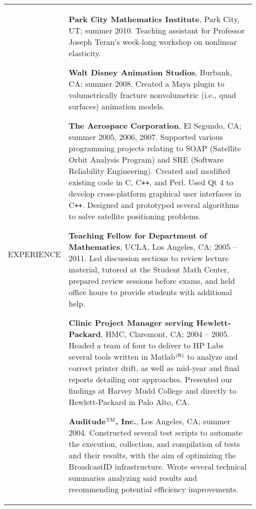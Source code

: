 \documentclass{article}
\begin{document}
\begin{center}
\vspace{\VS}

\begin{tabular}{@{}p{\CWa\columnwidth}@{}p{\CWb\columnwidth}@{}}
{\small EXPERIENCE} &
\begin{minipage}[t]{\CWb\columnwidth}
\par \textbf{Park City Mathematics Institute}, Park City, UT; summer 2010.  Teaching assistant for Professor Joseph Teran's week-long workshop on nonlinear elasticity.
\par \textbf{Walt Disney Animation Studios}, Burbank, CA; summer 2008.  Created a Maya plugin to volumetrically fracture nonvolumetric (i.e., quad surfaces) animation models.
\vspace{\VSEX}
\par \textbf{The Aerospace Corporation}, El Segundo, CA; summer 2005, 2006, 2007.  Supported various programming projects relating to SOAP (Satellite Orbit Analysis Program) and SRE (Software Reliability Engineering).  Created and modified existing code in C, C{\tt ++}, and Perl.  Used Qt 4 to develop cross-platform graphical user interfaces in C{\tt ++}.  Designed and prototyped several algorithms to solve satellite positioning problems.
\vspace{\VSEX}
\par \textbf{Teaching Fellow for Department of Mathematics}, UCLA, Los Angeles, CA; 2005 -- 2011.  Led discussion sections to review lecture material, tutored at the Student Math Center, prepared review sessions before exams, and held office hours to provide students with additional help.  %
\vspace{\VSEX}
\par \textbf{Clinic Project Manager serving Hewlett-Packard}, HMC, Claremont, CA; 2004 -- 2005.  Headed a team of four to deliver to HP Labs several tools written in Matlab$^{\rm (R)}$ to analyze and correct printer drift, as well as mid-year and final reports detailing our approaches.  Presented our findings at Harvey Mudd College and directly to Hewlett-Packard in Palo Alto, CA.
\vspace{\VSEX}
\par \textbf{Auditude$^{\rm TM}$, Inc.}, Los Angeles, CA; summer 2004.  Constructed several test scripts to automate the execution, collection, and compilation of tests and their results, with the aim of optimizing the BroadcastID infrastructure.  Wrote several technical summaries analyzing said results and recommending potential efficiency improvements.

\end{minipage}
\end{tabular}
\end{center}
\end{document}

